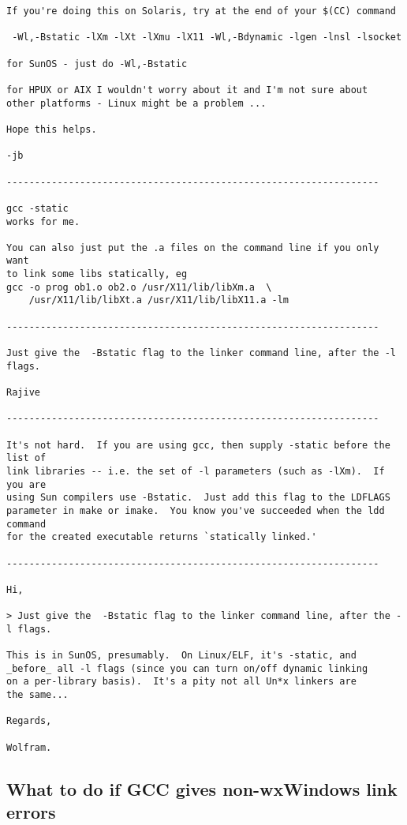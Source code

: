\begin{verbatim}
If you're doing this on Solaris, try at the end of your $(CC) command

 -Wl,-Bstatic -lXm -lXt -lXmu -lX11 -Wl,-Bdynamic -lgen -lnsl -lsocket

for SunOS - just do -Wl,-Bstatic

for HPUX or AIX I wouldn't worry about it and I'm not sure about
other platforms - Linux might be a problem ...

Hope this helps.

-jb

------------------------------------------------------------------

gcc -static
works for me.

You can also just put the .a files on the command line if you only want 
to link some libs statically, eg
gcc -o prog ob1.o ob2.o /usr/X11/lib/libXm.a  \
	/usr/X11/lib/libXt.a /usr/X11/lib/libX11.a -lm

------------------------------------------------------------------

Just give the  -Bstatic flag to the linker command line, after the -l flags.

Rajive

------------------------------------------------------------------

It's not hard.  If you are using gcc, then supply -static before the list of
link libraries -- i.e. the set of -l parameters (such as -lXm).  If you are
using Sun compilers use -Bstatic.  Just add this flag to the LDFLAGS
parameter in make or imake.  You know you've succeeded when the ldd command
for the created executable returns `statically linked.'

------------------------------------------------------------------

Hi,

> Just give the  -Bstatic flag to the linker command line, after the -l flags.

This is in SunOS, presumably.  On Linux/ELF, it's -static, and
_before_ all -l flags (since you can turn on/off dynamic linking
on a per-library basis).  It's a pity not all Un*x linkers are
the same...

Regards,

Wolfram.
\end{verbatim}

\subsection{What to do if GCC gives non-wxWindows link errors}

